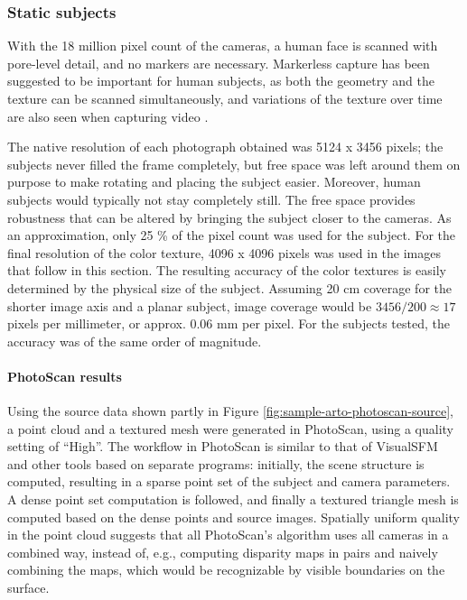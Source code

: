 \subsubsection{Static subjects}

With the 18 million pixel count of the cameras, a human face is scanned with pore-level detail, and no markers are necessary.
Markerless capture has been suggested to be important for human subjects, as both the geometry and the texture can be scanned simultaneously, and variations of the texture over time are also seen when capturing video \cite{bradley2010high}.

The native resolution of each photograph obtained was 5124 x 3456 pixels; the subjects never filled the frame completely, but free space was left around them on purpose to make rotating and placing the subject easier.
Moreover, human subjects would typically not stay completely still.
The free space provides robustness that can be altered by bringing the subject closer to the cameras.
As an approximation, only 25 \% of the pixel count was used for the subject.
For the final resolution of the color texture, 4096 x 4096 pixels was used in the images that follow in this section.
The resulting accuracy of the color textures is easily determined by the physical size of the subject.
Assuming 20 cm coverage for the shorter image axis and a planar subject, image coverage would be $3456 / 200 \approx 17$ pixels per millimeter, or approx. 0.06 mm per pixel.
For the subjects tested, the accuracy was of the same order of magnitude.

\paragraph{PhotoScan results}
Using the source data shown partly in Figure \ref{fig:sample-arto-photoscan-source}, a point cloud and a textured mesh were generated in PhotoScan, using a quality setting of ``High''.
The workflow in PhotoScan is similar to that of VisualSFM and other tools based on separate programs:
initially, the scene structure is computed, resulting in a sparse point set of the subject and camera parameters.
A dense point set computation is followed, and finally a textured triangle mesh is computed based on the dense points and source images.
Spatially uniform quality in the point cloud suggests that all PhotoScan's algorithm uses all cameras in a combined way, instead of, e.g., computing disparity maps in pairs and naively combining the maps, which would be recognizable by visible boundaries on the surface.

